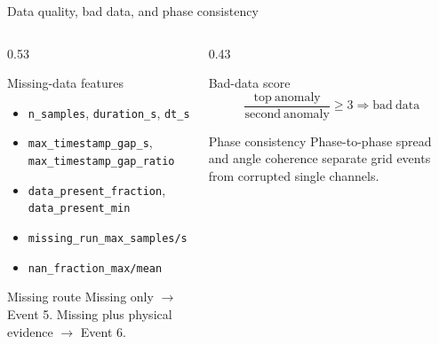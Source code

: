 \documentclass[aspectratio=169,10pt,t]{beamer}
\newcommand{\code}[1]{\texttt{\footnotesize #1}}
\begin{document}
\fi
\begin{frame}{Data quality, bad data, and phase consistency}
\small
\begin{columns}[T,totalwidth=\textwidth]
\begin{column}{0.53\textwidth}
\begin{block}{Missing-data features}
\begin{itemize}
  \item \code{n\_samples}, \code{duration\_s}, \code{dt\_s}
  \item \code{max\_timestamp\_gap\_s}, \code{max\_timestamp\_gap\_ratio}
  \item \code{data\_present\_fraction}, \code{data\_present\_min}
  \item \code{missing\_run\_max\_samples/s}
  \item \code{nan\_fraction\_max/mean}
\end{itemize}
\end{block}
\begin{alertblock}{Missing route}
Missing only $\rightarrow$ Event 5. Missing plus physical evidence $\rightarrow$ Event 6.
\end{alertblock}
\end{column}
\begin{column}{0.43\textwidth}
\begin{exampleblock}{Bad-data score}
\[
\frac{\mathrm{top\ anomaly}}{\mathrm{second\ anomaly}}\ge3
\Rightarrow \mathrm{bad\ data}
\]
\end{exampleblock}
\begin{block}{Phase consistency}
Phase-to-phase spread and angle coherence separate grid events from corrupted single channels.
\end{block}
\end{column}
\end{columns}
\end{frame}
\end{document}

